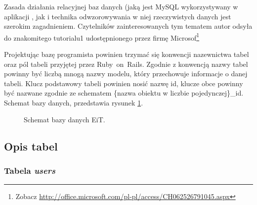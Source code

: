 \documentclass[a4paper,12pt,oneside]{report}
\begin{document}
Zasada działania relacyjnej baz danych (jaką jest MySQL wykorzystywany w aplikacji , jak i technika odwzorowywania w niej rzeczywistych danych jest szerokim zagadnieniem. Czytelników zainteresowanych tym tematem autor odsyła do znakomitego tutorialu1 udostępnionego przez firmę Microsof\footnote{Zobacz \url{http://office.microsoft.com/pl-pl/access/CH062526791045.aspx}}

Projektując bazę programista powinien trzymać się konwencji nazewnictwa tabel oraz pól tabeli przyjętej przez Ruby~on~Rails. Zgodnie z konwencją nazwy tabel powinny być liczbą mnogą nazwy modelu, który przechowuje informacje o danej tabeli. Klucz podstawowy tabeli powinien nosić nazwę id, klucze obce powinny być nazwane zgodnie ze schematem \{nazwa obiektu w liczbie pojedynczej\}\_id. Schemat bazy danych, przedstawia rysunek \ref{fig:database}.

\newpage
\thispagestyle{empty}
\addtolength{\textwidth}{4cm}
\addtolength{\hoffset}{-2.5cm}
\addtolength{\textheight}{5cm}
\addtolength{\voffset}{-3.5cm}
\begin{landscape}
\begin{figure}
\centering
  \caption{
  Schemat bazy danych EiT.
  \label{fig:database}
  }
\end{figure}
\end{landscape}
\newpage

\addtolength{\textwidth}{-4cm}
\addtolength{\hoffset}{2.5cm}
\addtolength{\textheight}{-5cm}
\addtolength{\voffset}{3.5cm}
\subsection{Opis tabel}
\label{sub:tabele}

\subsubsection{Tabela \emph{users}}
\label{subsub:users}
\end{document}
